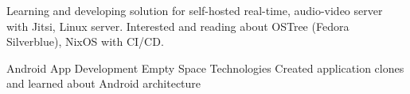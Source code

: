 \documentclass[
	a4paper,
]{fortysecondscv}
\begin{document}
\vspace{1cm} Learning and developing solution for self-hosted real-time, audio-video server with Jitsi, Linux server. Interested and reading about OSTree (Fedora Silverblue), NixOS with CI/CD. \vspace{0.5cm}

\begin{cvtable}[2]
    {Android App Development}
    {Empty Space Technologies}
    {Created application clones and learned about Android architecture}
\end{cvtable}

\begin{cvtable}[2]
\end{cvtable}

\end{document}
